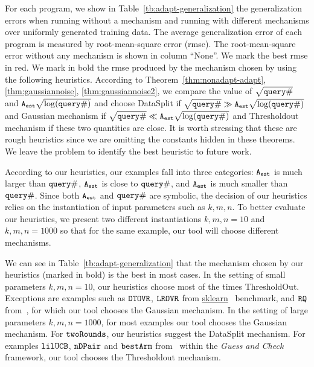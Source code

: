 For each program, we show in Table~\ref{tb:adapt-generalization} the
generalization errors when running without a mechanism and running
with different mechanisms over uniformly generated training data.  The
average generalization error of each program is measured by
root-mean-square error (rmse).  The root-mean-square error without any
mechanism is shown in column ``None''. 
We mark the best rmse in red.
We mark in bold the rmse
produced by the mechanism chosen by {\THESYSTEM} using the following
heuristics.  According to Theorem~\ref{thm:nonadapt-adapt},\ref{thm:gaussiannoise},
\ref{thm:gaussiannoise2},
we compare the value of $\sqrt{{\tt query} \#}$ and
${\mathtt{A_{est}}}\sqrt{\log({\tt query} \#)}$ and choose DataSplit if
$\sqrt{{\tt query} \#} \gg {\ensuremath{\mathtt{A_{est}}}}\sqrt{\log({\tt query} \#)}$ and Gaussian
mechanism if $\sqrt{{\tt query} \#} \ll {\ensuremath{\mathtt{A_{est}}}}\sqrt{\log({\tt query} \#)}$ and
Thresholdout mechanism if these two quantities are close. 
 It is worth
stressing that these are rough heuristics since we are omitting the
constants hidden in these theorems. We leave the problem to identify
the best heuristic to future work.


    According to our heuristics, our examples fall into three categories: 
    ${\mathtt{A_{est}}}$ is much larger than ${\tt query} \#$, ${\mathtt{A_{est}}}$ is close to  ${\tt query} \#$,
    and ${\mathtt{A_{est}}}$ is much smaller than ${\tt query} \#$. 
    Since both ${\mathtt{A_{est}}}$ and ${\tt query} \#$ are symbolic, the decision of our heuristics relies on 
    the instantiation of input parameters such as $k,m, n$. To better evaluate our heuristics, we present two different instantiations $k,m,n=10$ and $k,m, n =1000$ so that
    for the same example, our tool will choose different mechanisms.

We can see in Table~\ref{tb:adapt-generalization} that the mechanism
chosen by our heuristics (marked in bold) is the best in most cases.
In the setting of small parameters $k,m,n=10$, our heuristics
choose most of the times ThresholdOut. Exceptions are examples such as $\mathtt{DTOVR}$,
$\mathtt{LROVR}$
from \hyperlink{https://github.com/scikit-learn/scikit-learn/tree/main/examples}{sklearn}~\cite{SklearnBenchmark}
benchmark, and $\mathtt{RQ}$ from~\cite{Jamieson2015TheAO}, for which our tool
chooses the Gaussian mechanism.  In the setting of large parameters
$k,m,n=1000$, 
for most examples our tool chooses the Gaussian mechanism.
For $\mathtt{twoRounds}$, our heuristics suggest the DataSplit mechanism. For examples $\mathtt{lilUCB}$,
$\mathtt{nDPair}$ and $\mathtt{bestArm}$ from~\cite{Jamieson2015TheAO} within
the \emph{Guess and Check}~\cite{RogersRSSTW20} framework, our tool chooses the Thresholdout mechanism.

